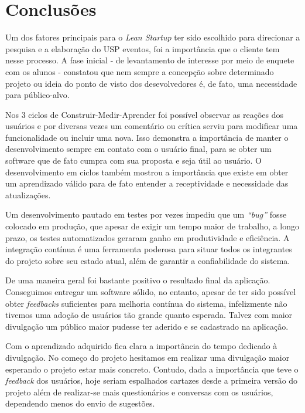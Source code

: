 \chapter{Conclusões}
\label{cap:conclusoes}

\par Um dos fatores principais para o \emph{Lean Startup} ter sido escolhido para direcionar a pesquisa e a elaboração do USP eventos, foi a importância que o cliente tem nesse processo. A fase inicial - de levantamento de interesse por meio de enquete com os alunos - constatou que nem sempre a concepção sobre determinado projeto ou ideia do ponto de visto dos desevolvedores é, de fato, uma necessidade para público-alvo.

\par Nos 3 ciclos de Construir-Medir-Aprender foi possível observar as reações dos usuários e por diversas vezes um comentário ou crítica serviu para modificar uma funcionalidade ou incluir uma nova. Isso demonstra a importância de manter o desenvolvimento sempre em contato com o usuário final, para se obter um software que de fato cumpra com sua proposta e seja útil ao usuário. O desenvolvimento em ciclos também mostrou a importância que existe em obter um aprendizado válido para de fato entender a receptividade e necessidade das atualizações.

\par Um desenvolvimento pautado em testes por vezes impediu que um \emph{``bug''} fosse colocado em produção, que apesar de exigir um tempo maior de trabalho, a longo prazo, os testes automatizados geraram ganho em produtividade e eficiência. A integração contínua é uma ferramenta poderosa para situar todos os integrantes do projeto sobre seu estado atual, além de garantir a confiabilidade do sistema.

\par De uma maneira geral foi bastante positivo o resultado final da aplicação. Conseguimos entregar um software sólido, no entanto, apesar de ter sido possível obter \emph{feedbacks} suficientes para melhoria contínua do sistema, infelizmente não tivemos uma adoção de usuários tão grande quanto esperada. Talvez com maior divulgação um público maior pudesse ter aderido e se cadastrado na aplicação.

\par Com o aprendizado adquirido fica clara a importância do tempo dedicado à divulgação. No começo do projeto hesitamos em realizar uma divulgação maior esperando o projeto estar mais concreto. Contudo, dada a importância que teve o \emph{feedback} dos usuários, hoje seriam espalhados cartazes desde a primeira versão do projeto além de realizar-se mais questionários e conversas com os usuários, dependendo menos do envio de sugestões.

